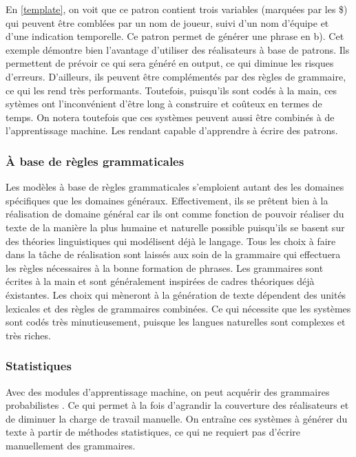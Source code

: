 En \ref{template}, on voit que ce patron contient trois variables (marquées par les \$) qui peuvent être comblées par un nom de joueur, suivi d'un nom d'équipe et d'une indication temporelle. Ce patron permet de générer une phrase en b). Cet exemple démontre bien l'avantage d'utiliser des réalisateurs à base de patrons. Ils permettent de prévoir ce qui sera généré en output, ce qui diminue les risques d'erreurs. D'ailleurs, ils peuvent être complémentés par des règles de grammaire, ce qui les rend très performants. Toutefois, puisqu'ils sont codés à la main, ces sytèmes ont l'inconvénient d'être long à construire et coûteux en termes de temps. On notera toutefois que ces systèmes peuvent aussi être combinés à de l'apprentissage machine. Les rendant capable d'apprendre à écrire des patrons.

\subsubsection{À base de règles grammaticales}
Les modèles à base de règles grammaticales s'emploient autant des les domaines spécifiques que les domaines généraux. Effectivement, ils se prêtent bien à la réalisation de domaine général car ils ont comme fonction de pouvoir réaliser du texte de la manière la plus humaine et naturelle possible puisqu'ils se basent sur des théories linguistiques qui modélisent déjà le langage. Tous les choix à faire dans la tâche de réalisation sont laissés aux soin de la grammaire qui effectuera les règles nécessaires à la bonne formation de phrases. Les grammaires sont écrites à la main et sont généralement inspirées de cadres théoriques déjà éxistantes. Les choix qui mèneront à la génération de texte dépendent des unités lexicales et des règles de grammaires combinées. Ce qui nécessite que les systèmes sont codés très minutieusement, puisque les langues naturelles sont complexes et très riches.

\subsubsection{Statistiques}

Avec des modules d'apprentissage machine, on peut acquérir des grammaires probabilistes \citep{gatt18}. Ce qui permet à la fois d'agrandir la couverture des réalisateurs et de diminuer la charge de travail manuelle. On entraîne ces systèmes à générer du texte à partir de méthodes statistiques, ce qui ne requiert pas d'écrire manuellement des grammaires.

